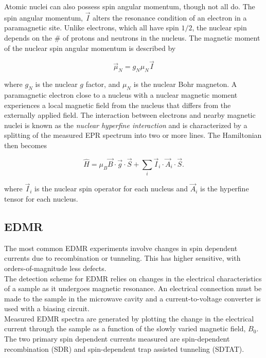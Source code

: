 \documentclass[svgnames]{article}
\begin{document}
Atomic nuclei can also possess spin angular momentum, though not all do. The
spin angular momentum, $\vec{I}$ alters the resonance condition of an electron
in a paramagnetic site. Unlike electrons, which all have spin $1/2$, the nuclear
spin depends on the \# of protons and neutrons in the nucleus. The magnetic
moment of the nuclear spin angular momentum is described by 

\[
    \vec{\mu}_N = g_N \mu_N \vec{I}
\] \vspace{3px}


where $g_N$ is the nuclear $g$ factor, and $\mu_N$ is the nuclear Bohr magneton.
A paramagnetic electron close to a nucleus with a nuclear magnetic moment
experiences a local magnetic field from the nucleus that differs from the
externally applied field. The interaction between electrons and nearby magnetic
nuclei is known as the \textit{nuclear hyperfine interaction} and is
characterized by a splitting of the measured EPR spectrum into two or more
lines. The Hamiltonian then becomes 

\[
    \hat{H} = \mu_B \vec{B} \cdot \vec{g} \cdot \vec{S} + \sum_{i}^{} \vec{I}_i
    \cdot \vec{A}_i \cdot \vec{S}. 
\] \vspace{3px}

where $\vec{I}_i$ is the nuclear spin operator for each nucleus and $\vec{A}_i$
is the hyperfine tensor for each nucleus. 

\subsection{EDMR} 

The most common EDMR experiments involve changes in spin dependent currents due
to recombination or tunneling. This has higher sensitive, with orders-of-magnitude 
less defects. \\ 

The detection scheme for EDMR relies on changes in the electrical
characteristics of a sample as it undergoes magnetic resonance. An electrical
connection must be made to the sample in the microwave cavity and a
current-to-voltage converter is used with a biasing circuit. \\ 

Measured EDMR spectra are generated by plotting the change in the electrical
current through the sample as a function of the slowly varied magnetic field,
$B_0$. The two primary spin dependent currents measured are spin-dependent
recombination (SDR) and spin-dependent trap assisted tunneling (SDTAT). 
\end{document}
